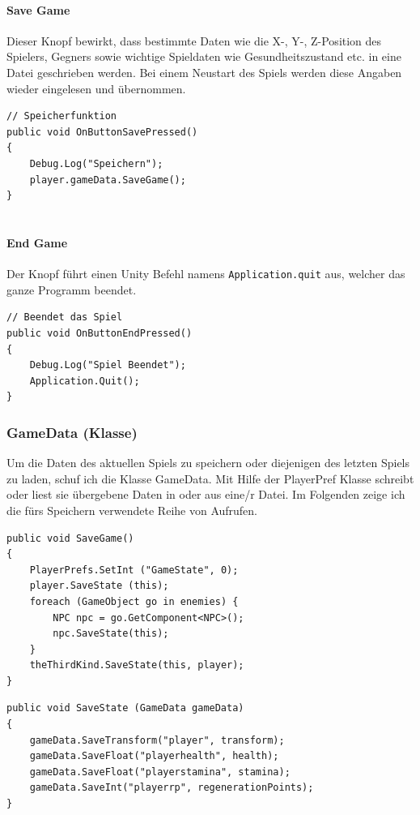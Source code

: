 \paragraph{Save Game}
Dieser Knopf bewirkt, dass bestimmte Daten wie die X-, Y-, Z-Position des Spielers, Gegners sowie wichtige Spieldaten wie Gesundheitszustand etc. in eine Datei geschrieben werden. Bei einem Neustart des Spiels werden diese Angaben wieder eingelesen und übernommen.

\begin{lstlisting}[caption={Save Game}]
// Speicherfunktion
public void OnButtonSavePressed()
{
	Debug.Log("Speichern");
	player.gameData.SaveGame();
}
	
\end{lstlisting}

\paragraph{End Game}
Der Knopf führt einen Unity Befehl namens \lstinline{Application.quit}  aus, welcher das ganze Programm beendet. 

\begin{lstlisting}[caption={End Game}]
// Beendet das Spiel
public void OnButtonEndPressed()
{
	Debug.Log("Spiel Beendet");
	Application.Quit();
}
\end{lstlisting}

\subsubsection{GameData (Klasse)}
Um die Daten des aktuellen Spiels zu speichern oder diejenigen des letzten Spiels zu laden, schuf ich die Klasse GameData.
Mit Hilfe der PlayerPref Klasse schreibt oder liest sie übergebene Daten in oder aus eine/r Datei. 
Im Folgenden zeige ich die fürs Speichern verwendete Reihe von Aufrufen.
\begin{lstlisting}[caption={Methode zur Speicherung des Spielstandes in GameData}]
public void SaveGame()
{
	PlayerPrefs.SetInt ("GameState", 0);
	player.SaveState (this);
	foreach (GameObject go in enemies) {
		NPC npc = go.GetComponent<NPC>();
		npc.SaveState(this);
	}
	theThirdKind.SaveState(this, player);
}
\end{lstlisting}


\begin{lstlisting}[caption={Methode SaveState in Player}]
public void SaveState (GameData gameData)
{
	gameData.SaveTransform("player", transform);
	gameData.SaveFloat("playerhealth", health);
	gameData.SaveFloat("playerstamina", stamina);
	gameData.SaveInt("playerrp", regenerationPoints);
}
\end{lstlisting}

